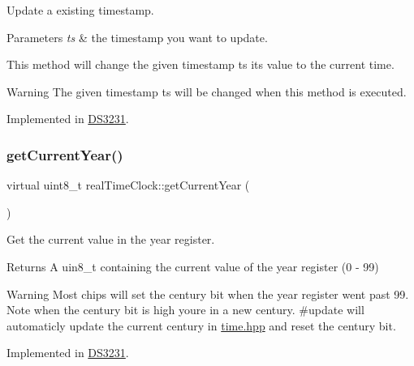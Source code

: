 Update a existing timestamp. 


\begin{DoxyParams}{Parameters}
{\em ts} & the timestamp you want to update.\\
\hline
\end{DoxyParams}
This method will change the given timestamp ts its value to the current time. \begin{DoxyWarning}{Warning}
The given timestamp ts will be changed when this method is executed. 
\end{DoxyWarning}


Implemented in \mbox{\hyperlink{class_d_s3231_ad94d54ed265fb5b911b4281f0103b0b0}{D\+S3231}}.

\mbox{\label{classreal_time_clock_a0cb99c34e2d6a089a62c8bea760c5add}} 
\subsubsection{\texorpdfstring{get\+Current\+Year()}{getCurrentYear()}}
{\footnotesize\ttfamily virtual uint8\+\_\+t real\+Time\+Clock\+::get\+Current\+Year (\begin{DoxyParamCaption}{ }\end{DoxyParamCaption})\hspace{0.3cm}{\ttfamily [pure virtual]}}



Get the current value in the year register. 

\begin{DoxyReturn}{Returns}
A uin8\+\_\+t containing the current value of the year register (0 -\/ 99) 
\end{DoxyReturn}
\begin{DoxyWarning}{Warning}
Most chips will set the century bit when the year register went past 99. Note when the century bit is high you\textquotesingle{}re in a new century. \#update will automaticly update the current century in \mbox{\hyperlink{time_8hpp_source}{time.\+hpp}} and reset the century bit. 
\end{DoxyWarning}


Implemented in \mbox{\hyperlink{class_d_s3231_a28a340b10b045ad1e8b94532a57c3759}{D\+S3231}}.

\mbox{\label{classreal_time_clock_a50e19a6b0aef44719e91e3e753da0dce}} 
